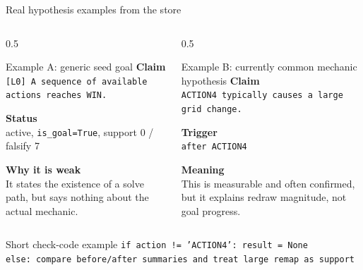 \documentclass[aspectratio=169]{beamer}
\begin{document}
\begin{frame}{Real hypothesis examples from the store}
\scriptsize
\begin{columns}[T,totalwidth=\textwidth]
\begin{column}{0.5\textwidth}
\begin{block}{Example A: generic seed goal}
\textbf{Claim}\\
\texttt{[L0] A sequence of available actions reaches WIN.}

\vspace{0.25em}
\textbf{Status}\\
active, \texttt{is\_goal=True}, support 0 / falsify 7

\vspace{0.25em}
\textbf{Why it is weak}\\
It states the existence of a solve path, but says nothing about the actual mechanic.
\end{block}
\end{column}
\begin{column}{0.5\textwidth}
\begin{block}{Example B: currently common mechanic hypothesis}
\textbf{Claim}\\
\texttt{ACTION4 typically causes a large grid change.}

\vspace{0.25em}
\textbf{Trigger}\\
\texttt{after ACTION4}

\vspace{0.25em}
\textbf{Meaning}\\
This is measurable and often confirmed, but it explains redraw magnitude, not goal progress.
\end{block}
\end{column}
\end{columns}

\vspace{0.35em}
\begin{block}{Short check-code example}
\texttt{if action != 'ACTION4': result = None}\\
\texttt{else: compare before/after summaries and treat large remap as support}
\end{block}
\end{frame}
\end{document}
